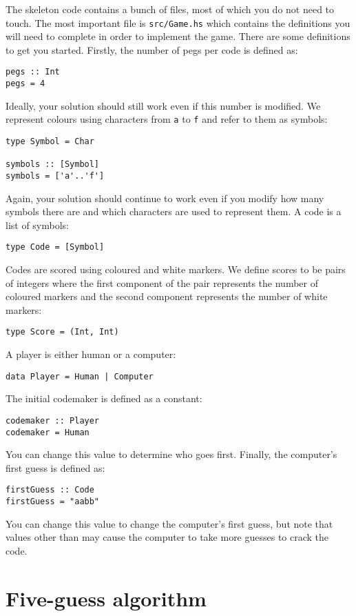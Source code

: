 The skeleton code contains a bunch of files, most of which you do not need to touch. The most important file is \texttt{\small src/Game.hs} which contains the definitions you will need to complete in order to implement the game. There are some definitions to get you started. Firstly, the number of pegs per code is defined as:
\begin{verbatim}
pegs :: Int 
pegs = 4
\end{verbatim}
Ideally, your solution should still work even if this number is modified. We represent colours using characters from \texttt{a} to \texttt{f} and refer to them as symbols:
\begin{verbatim}
type Symbol = Char 

symbols :: [Symbol]
symbols = ['a'..'f']
\end{verbatim}
Again, your solution should continue to work even if you modify how many symbols there are and which characters are used to represent them. A code is a list of symbols:
\begin{verbatim}
type Code = [Symbol]
\end{verbatim}
Codes are scored using coloured and white markers. We define scores to be pairs of integers where the first component of the pair represents the number of coloured markers and the second component represents the number of white markers:
\begin{verbatim}
type Score = (Int, Int)
\end{verbatim}
A player is either human or a computer:
\begin{verbatim}
data Player = Human | Computer
\end{verbatim}
The initial codemaker is defined as a constant:
\begin{verbatim}
codemaker :: Player
codemaker = Human
\end{verbatim}
You can change this value to determine who goes first. Finally, the computer's first guess is defined as:
\begin{verbatim}
firstGuess :: Code 
firstGuess = "aabb"
\end{verbatim}
You can change this value to change the computer's first guess, but note that values other than  may cause the computer to take more guesses to crack the code.


\section{Five-guess algorithm}

